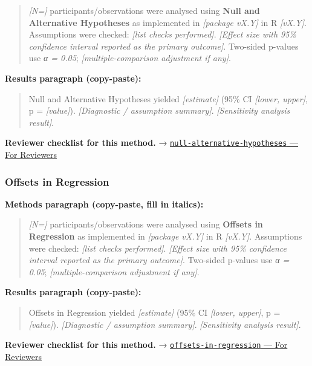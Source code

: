 \documentclass[
]{article}
\begin{document}
\begin{quote}
\emph{{[}N={]}} participants/observations were analysed using
\textbf{Null and Alternative Hypotheses} as implemented in
\emph{{[}package vX.Y{]}} in R \emph{{[}vX.Y{]}}. Assumptions were
checked: \emph{{[}list checks performed{]}}. \emph{{[}Effect size with
95\% confidence interval reported as the primary outcome{]}}. Two-sided
p-values use \emph{α = 0.05}; \emph{{[}multiple-comparison adjustment if
any{]}}.
\end{quote}

\textbf{Results paragraph (copy-paste):}

\begin{quote}
Null and Alternative Hypotheses yielded \emph{{[}estimate{]}} (95\% CI
\emph{{[}lower, upper{]}}, p = \emph{{[}value{]}}). \emph{{[}Diagnostic
/ assumption summary{]}}. \emph{{[}Sensitivity analysis result{]}}.
\end{quote}

\textbf{Reviewer checklist for this method.} →
\href{../chapters/04-inferential/null-alternative-hypotheses.Rmd\#for-reviewers}{\texttt{null-alternative-hypotheses}
--- For Reviewers}

\subsubsection{Offsets in Regression}\label{offsets-in-regression}

\textbf{Methods paragraph (copy-paste, fill in italics):}

\begin{quote}
\emph{{[}N={]}} participants/observations were analysed using
\textbf{Offsets in Regression} as implemented in \emph{{[}package
vX.Y{]}} in R \emph{{[}vX.Y{]}}. Assumptions were checked: \emph{{[}list
checks performed{]}}. \emph{{[}Effect size with 95\% confidence interval
reported as the primary outcome{]}}. Two-sided p-values use \emph{α =
0.05}; \emph{{[}multiple-comparison adjustment if any{]}}.
\end{quote}

\textbf{Results paragraph (copy-paste):}

\begin{quote}
Offsets in Regression yielded \emph{{[}estimate{]}} (95\% CI
\emph{{[}lower, upper{]}}, p = \emph{{[}value{]}}). \emph{{[}Diagnostic
/ assumption summary{]}}. \emph{{[}Sensitivity analysis result{]}}.
\end{quote}

\textbf{Reviewer checklist for this method.} →
\href{../chapters/07-regression/offsets-in-regression.Rmd\#for-reviewers}{\texttt{offsets-in-regression}
--- For Reviewers}
\end{document}
